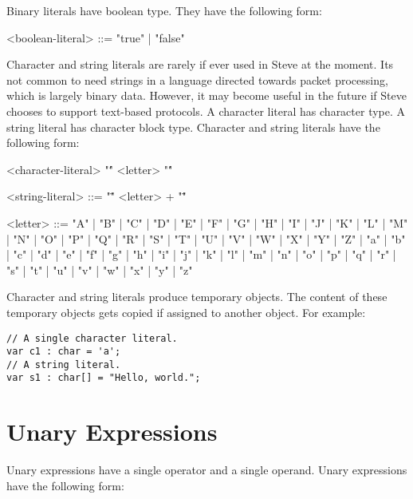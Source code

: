 Binary literals have boolean type. They have the following form:

\begin{minip}
\begin{grammar}
<boolean-literal> ::= "true" | "false"
\end{grammar}
\end{minip}

Character and string literals are rarely if ever used in Steve at the moment. Its not common to need strings in a language directed towards packet processing, which is largely binary data. However, it may become useful in the future if Steve chooses to support text-based protocols. A character literal has character type. A string literal has character block type. Character and string literals have the following form:

\begin{minip}
\begin{grammar}
<character-literal> "\'" <letter> "\'"

<string-literal> ::= "\"" <letter> + "\""

<letter> ::= "A" | "B" | "C" | "D" | "E" | "F" | "G"
       | "H" | "I" | "J" | "K" | "L" | "M" | "N"
       | "O" | "P" | "Q" | "R" | "S" | "T" | "U"
       | "V" | "W" | "X" | "Y" | "Z" | "a" | "b"
       | "c" | "d" | "e" | "f" | "g" | "h" | "i"
       | "j" | "k" | "l" | "m" | "n" | "o" | "p"
       | "q" | "r" | "s" | "t" | "u" | "v" | "w"
       | "x" | "y" | "z"
\end{grammar}
\end{minip}

Character and string literals produce temporary objects. The content of these temporary objects gets copied if assigned to another object. For example:

\begin{minip}
\begin{lstlisting}
// A single character literal.
var c1 : char = 'a';
// A string literal.
var s1 : char[] = "Hello, world."; 
\end{lstlisting}
\end{minip}

\section{Unary Expressions} \label{guide:unary_expr}

Unary expressions have a single operator and a single operand. Unary expressions have the following form:

